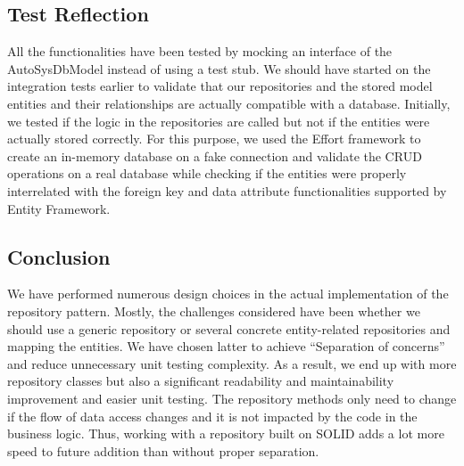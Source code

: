 \subsection{Test Reflection}
All the functionalities have been tested by mocking an interface of the AutoSysDbModel instead of using a test stub. We should have started on the integration tests earlier to validate that our repositories and the stored model entities and their relationships are actually compatible with a database. Initially, we tested if the logic in the repositories are called but not if the entities were actually stored correctly. For this purpose, we used the Effort framework to create an in-memory database on a fake connection and validate the CRUD operations on a real database while checking if the entities were properly interrelated with the foreign key and data attribute functionalities supported by Entity Framework.

\subsection{Conclusion}
We have performed numerous design choices in the actual implementation of the repository pattern. Mostly, the challenges considered have been whether we should use a generic repository or several concrete entity-related repositories and mapping the entities. We have chosen latter to achieve “Separation of concerns” and reduce unnecessary unit testing complexity. As a result, we end up with more repository classes but also a significant readability and maintainability improvement and easier unit testing. The repository methods only need to change if the flow of data access changes and it is not impacted by the code in the business logic. Thus, working with a repository built on SOLID adds a lot more speed to future addition than without proper separation.
